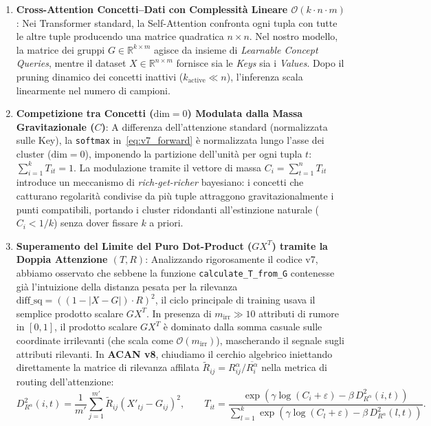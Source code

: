 \documentclass[10pt,a4paper]{article}
\begin{document}
\begin{enumerate}
    \item \textbf{Cross-Attention Concetti--Dati con Complessit\`a Lineare $\mathcal{O}(k \cdot n \cdot m)$}:
    Nei Transformer standard, la Self-Attention confronta ogni tupla con tutte le altre tuple producendo una matrice quadratica $n \times n$. Nel nostro modello, la matrice dei gruppi $G \in \mathbb{R}^{k \times m}$ agisce da insieme di \textit{Learnable Concept Queries}, mentre il dataset $X \in \mathbb{R}^{n \times m}$ fornisce sia le \textit{Keys} sia i \textit{Values}. Dopo il pruning dinamico dei concetti inattivi ($k_{\text{active}} \ll n$), l'inferenza scala linearmente nel numero di campioni.
    \item \textbf{Competizione tra Concetti ($\text{dim}=0$) Modulata dalla Massa Gravitazionale ($C$)}:
    A differenza dell'attenzione standard (normalizzata sulle Key), la \texttt{softmax} in~\eqref{eq:v7_forward} \`e normalizzata lungo l'asse dei cluster ($\text{dim}=0$), imponendo la partizione dell'unit\`a per ogni tupla $t$: $\sum_{i=1}^{k} T_{it} = 1$. La modulazione tramite il vettore di massa $C_i = \sum_{t=1}^{n} T_{it}$ introduce un meccanismo di \textit{rich-get-richer} bayesiano: i concetti che catturano regolarit\`a condivise da pi\`u tuple attraggono gravitazionalmente i punti compatibili, portando i cluster ridondanti all'estinzione naturale ($C_i < 1/k$) senza dover fissare $k$ a priori.
    \item \textbf{Superamento del Limite del Puro Dot-Product ($G X^T$) tramite la Doppia Attenzione $(T, R)$}:
    Analizzando rigorosamente il codice v7, abbiamo osservato che sebbene la funzione \texttt{calculate\_T\_from\_G} contenesse gi\`a l'intuizione della distanza pesata per la rilevanza $\text{diff\_sq} = ((1 - |X - G|) \cdot R)^2$, il ciclo principale di training usava il semplice prodotto scalare $G X^T$. In presenza di $m_{\text{irr}} \gg 10$ attributi di rumore in $[0,1]$, il prodotto scalare $G X^T$ \`e dominato dalla somma casuale sulle coordinate irrilevanti (che scala come $\mathcal{O}(m_{\text{irr}})$), mascherando il segnale sugli attributi rilevanti. In \textbf{ACAN v8}, chiudiamo il cerchio algebrico iniettando direttamente la matrice di rilevanza affilata $\tilde{R}_{ij} = R_{ij}^\alpha / \overline{R_i^\alpha}$ nella metrica di routing dell'attenzione:
    \begin{equation}
    D^2_{R^\alpha}(i, t) = \frac{1}{m'} \sum_{j=1}^{m'} \tilde{R}_{ij} \left( X'_{tj} - G_{ij} \right)^2, \qquad
    T_{it} = \frac{\exp\!\left(\gamma \log(C_i + \varepsilon) - \beta \, D^2_{R^\alpha}(i, t)\right)}{\sum_{l=1}^{k} \exp\!\left(\gamma \log(C_l + \varepsilon) - \beta \, D^2_{R^\alpha}(l, t)\right)}.
    \label{eq:v8_routing}
    \end{equation}
\end{enumerate}
\end{document}
